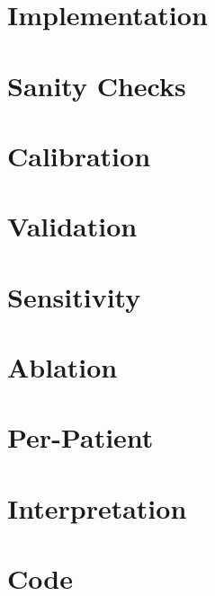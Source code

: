 \chapter{Implementation}
\chapter{Sanity Checks}
\chapter{Calibration}
\chapter{Validation}
\chapter{Sensitivity}
\chapter{Ablation}
\chapter{Per-Patient}
\chapter{Interpretation}



\nocite{*} 



\appendix
\chapter{Code}

